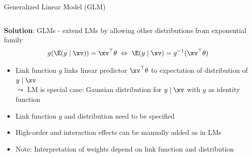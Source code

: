 \documentclass[11pt,compress,t,notes=noshow, aspectratio=169, xcolor=table]{beamer}
\begin{document}
\begin{frame}{Generalized Linear Model (GLM) }
\begin{columns}
\begin{column}{0.55\textwidth}
\begin{center}
        \end{center}
    \end{column}
\end{columns}
\medskip
\pause
\textbf{Solution}: GLMs - extend LMs by allowing other distributions from exponential family
$$g(\E (y \mid \xv)) = \xv^\top \theta \; \Leftrightarrow \; \E (y \mid \xv) = g^{-1}(\xv^\top \theta)$$
\vspace*{-0.5cm}
    \begin{itemize}
        \item Link function $g$ links linear predictor $\xv^\top \theta$ to expectation of distribution of $y \mid \xv$\\ %
        $\leadsto$ LM is special case: Gaussian distribution for $y \mid \xv$ with $g$ as identity function 
        \item Link function $g$ and distribution need to be specified 
        \item High-order and interaction effects can be manually added as in LMs
        \item Note: Interpretation of weights depend on link function and distribution
    \end{itemize}
\end{frame}
 	
\end{document}
